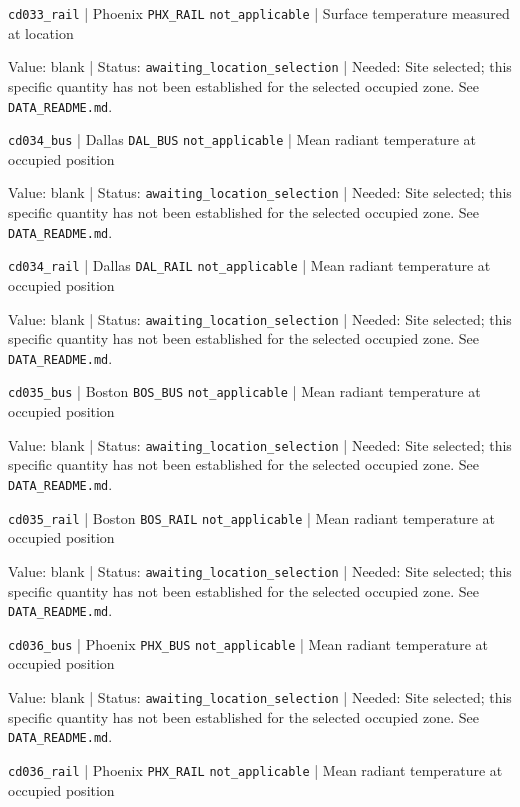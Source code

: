\nolinkurl{cd033_rail} | Phoenix \nolinkurl{PHX_RAIL} \nolinkurl{not_applicable} | Surface temperature measured at location

Value: blank | Status: \nolinkurl{awaiting_location_selection} | Needed: Site selected; this specific quantity has not been established for the selected occupied zone. See \nolinkurl{DATA_README.md}.

\nolinkurl{cd034_bus} | Dallas \nolinkurl{DAL_BUS} \nolinkurl{not_applicable} | Mean radiant temperature at occupied position

Value: blank | Status: \nolinkurl{awaiting_location_selection} | Needed: Site selected; this specific quantity has not been established for the selected occupied zone. See \nolinkurl{DATA_README.md}.

\nolinkurl{cd034_rail} | Dallas \nolinkurl{DAL_RAIL} \nolinkurl{not_applicable} | Mean radiant temperature at occupied position

Value: blank | Status: \nolinkurl{awaiting_location_selection} | Needed: Site selected; this specific quantity has not been established for the selected occupied zone. See \nolinkurl{DATA_README.md}.

\nolinkurl{cd035_bus} | Boston \nolinkurl{BOS_BUS} \nolinkurl{not_applicable} | Mean radiant temperature at occupied position

Value: blank | Status: \nolinkurl{awaiting_location_selection} | Needed: Site selected; this specific quantity has not been established for the selected occupied zone. See \nolinkurl{DATA_README.md}.

\nolinkurl{cd035_rail} | Boston \nolinkurl{BOS_RAIL} \nolinkurl{not_applicable} | Mean radiant temperature at occupied position

Value: blank | Status: \nolinkurl{awaiting_location_selection} | Needed: Site selected; this specific quantity has not been established for the selected occupied zone. See \nolinkurl{DATA_README.md}.

\nolinkurl{cd036_bus} | Phoenix \nolinkurl{PHX_BUS} \nolinkurl{not_applicable} | Mean radiant temperature at occupied position

Value: blank | Status: \nolinkurl{awaiting_location_selection} | Needed: Site selected; this specific quantity has not been established for the selected occupied zone. See \nolinkurl{DATA_README.md}.

\nolinkurl{cd036_rail} | Phoenix \nolinkurl{PHX_RAIL} \nolinkurl{not_applicable} | Mean radiant temperature at occupied position

